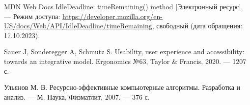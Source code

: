 \begin{thebibliography}{}
	MDN Web Docs IdleDeadline: timeRemaining() method [Электронный ресурс]. --- Режим доступа: \url{https://developer.mozilla.org/en-US/docs/Web/API/IdleDeadline/timeRemaining}, свободный (дата обращения: 17.10.2023).

	Sauer J, Sonderegger A, Schmutz S. Usability, user experience and accessibility: towards an integrative model. Ergonomics №63, Taylor \& Francis, 2020. --- 1207 с.

	Ульянов М. В. Ресурсно-эффективные компьютерные алгоритмы. Разработка и анализ. --- М. Наука, Физматлит, 2007. --- 376 с.
\end{thebibliography}
\endgroup

\pagebreak